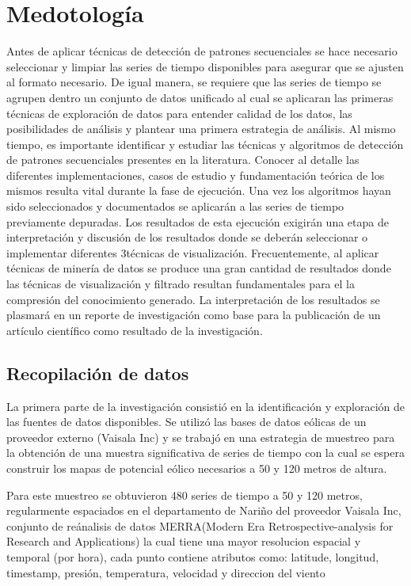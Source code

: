 \section{Medotología}


Antes de aplicar técnicas de detección de patrones secuenciales se hace necesario 
seleccionar y limpiar las series de tiempo disponibles para asegurar que
se ajusten al formato necesario. De igual manera, se requiere que las series de
tiempo se agrupen dentro un conjunto de datos unificado al cual se aplicaran las
primeras técnicas de exploración de datos para entender calidad de los datos,
las posibilidades de análisis y plantear una primera estrategia de análisis.
Al mismo tiempo, es importante identificar y estudiar las técnicas y algoritmos
 de detección de patrones secuenciales presentes en la literatura. Conocer
al detalle las diferentes implementaciones, casos de estudio y fundamentación
teórica de los mismos resulta vital durante la fase de ejecución. Una vez los
algoritmos hayan sido seleccionados y documentados se aplicarán a las series de
tiempo previamente depuradas.
Los resultados de esta ejecución exigirán una etapa de interpretación y discusión
 de los resultados donde se deberán seleccionar o implementar diferentes
3técnicas de visualización. Frecuentemente, al aplicar técnicas de minería de datos
se produce una gran cantidad de resultados donde las técnicas de visualización y
filtrado resultan fundamentales para el la compresión del conocimiento generado.
La interpretación de los resultados se plasmará en un reporte de investigación
como base para la publicación de un artículo científico como resultado de la
investigación.

\subsection{Recopilación de datos}

La primera parte de la investigación consistió en la identificación y exploración
 de las fuentes de datos disponibles. Se utilizó las
bases de datos eólicas de un proveedor externo (Vaisala Inc) y se trabajó
en una estrategia de muestreo para la obtención de una muestra significativa de
series de tiempo con la cual se espera construir los mapas de potencial eólico
necesarios a 50 y 120 metros de altura. 

Para este muestreo se obtuvieron 480 series de tiempo a 50 y 120 metros, regularmente
espaciados en el departamento de Nariño del proveedor Vaisala Inc, conjunto de reánalisis de datos MERRA(Modern Era Retrospective-analysis for Research and Applications) la cual
tiene una mayor resolucion espacial y temporal (por hora), cada punto contiene
atributos como: latitude, longitud, timestamp, presión, temperatura, velocidad y direccion del viento



